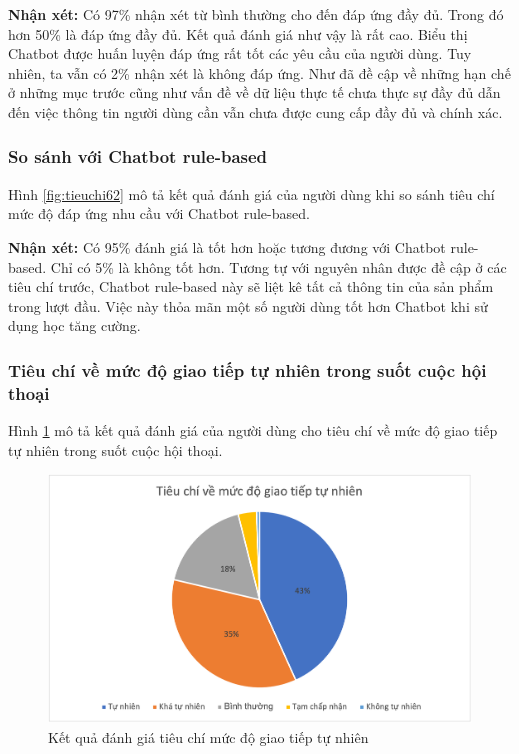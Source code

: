 \textbf{Nhận xét:}
Có 97\% nhận xét từ bình thường cho đến đáp ứng đầy đủ. Trong đó hơn
50\% là đáp ứng đầy đủ. Kết quả đánh giá như vậy là rất cao. Biểu thị
Chatbot được huấn luyện đáp ứng rất tốt các yêu cầu của người dùng.
Tuy nhiên, ta vẫn có 2\% nhận xét là không đáp ứng. Như đã đề cập về
những hạn chế ở những mục trước cũng như vấn đề về dữ liệu thực tế
chưa thực sự đầy đủ dẫn đến việc thông tin người dùng cần vẫn
chưa được cung cấp đầy đủ và chính xác.

\subsubsection{So sánh với Chatbot rule-based}
Hình \ref{fig:tieuchi62} mô tả kết quả đánh giá của người dùng khi
so sánh tiêu chí mức độ đáp ứng nhu cầu với Chatbot rule-based.

\textbf{Nhận xét:}
Có 95\% đánh giá là tốt hơn hoặc tương đương với Chatbot rule-based.
Chỉ có 5\% là không tốt hơn. Tương tự với nguyên nhân được đề cập ở
các tiêu chí trước, Chatbot rule-based này sẽ liệt kê tất cả thông tin
của sản phẩm trong lượt đầu. Việc này thỏa mãn một số người dùng tốt
hơn Chatbot khi sử dụng học tăng cường.

\subsubsection{Tiêu chí về mức độ giao tiếp tự nhiên trong suốt
cuộc hội thoại}
Hình \ref{fig:tieuchi7} mô tả kết quả đánh giá của người dùng cho
tiêu chí về mức độ giao tiếp tự nhiên trong suốt cuộc hội thoại.

\begin{figure}[ht!]
    \centering
    \includegraphics[scale=0.91]{thesis/chatbot/ketqua/img/tieuchi7.png}
    \caption{Kết quả đánh giá tiêu chí mức độ giao tiếp tự nhiên}
    \label{fig:tieuchi7}
\end{figure}

